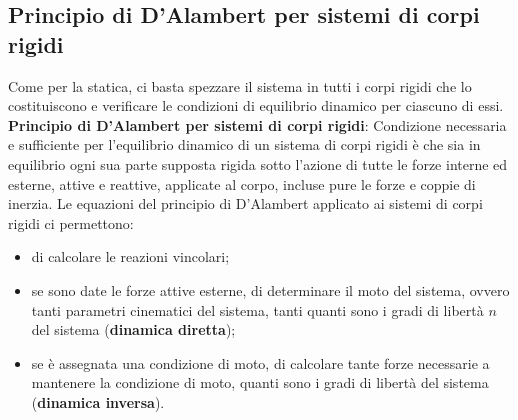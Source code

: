 \subsection{Principio di D'Alambert per sistemi di corpi rigidi}
Come per la statica, ci basta spezzare il sistema in tutti i corpi rigidi che lo costituiscono e verificare le condizioni di equilibrio dinamico per ciascuno di essi.\newline
\newline
\textbf{Principio di D'Alambert per sistemi di corpi rigidi}:\newline
Condizione necessaria e sufficiente per l'equilibrio dinamico di un sistema di corpi rigidi è che sia in equilibrio ogni sua parte supposta rigida sotto l'azione di tutte le forze interne ed esterne, attive e reattive, applicate al corpo, incluse pure le forze e coppie di inerzia.\newline
\newline
Le equazioni del principio di D'Alambert applicato ai sistemi di corpi rigidi ci permettono:
\begin{itemize}
    \item di calcolare le reazioni vincolari;
    \item se sono date le forze attive esterne, di determinare il moto del sistema, ovvero tanti parametri cinematici del sistema, tanti quanti sono i gradi di libertà $n$ del sistema (\textbf{dinamica diretta});
    \item se è assegnata una condizione di moto, di calcolare tante forze necessarie a mantenere la condizione di moto, quanti sono i gradi di libertà del sistema (\textbf{dinamica inversa}).
\end{itemize}